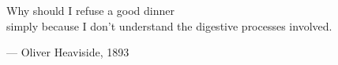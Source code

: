 \begin{flushright}
\begin{hangleftquote}{\QENOpen}{\QENClose}
Why should I refuse a good dinner\\
simply because I don't understand the digestive processes involved.
\end{hangleftquote}
\par\smallskip
\normalfont — Oliver Heaviside, 1893
\end{flushright}
